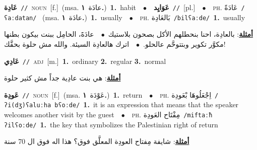 \documentclass[10pt,a4paper,twoside]{article} %
\begin{document}
\begin{multicols}{2}
{\setlength\topsep{0pt}\textbf{\foreignlanguage{arabic}{عَادِة}}\ {\color{gray}\texttt{//}\color{black}}\ \textsc{noun}\ [f.]\ \color{gray}(msa. \foreignlanguage{arabic}{عادَة}~\foreignlanguage{arabic}{\textbf{١.}})\color{black}\ \textbf{1.}~habit\ \ $\bullet$\ \ \setlength\topsep{0pt}\textbf{\foreignlanguage{arabic}{عَوَايِد}}\ {\color{gray}\texttt{//}\color{black}}\ [pl.]\ \ $\bullet$\ \ \textsc{ph.} \color{gray} \foreignlanguage{arabic}{عَادَةً}\color{black}\ {\color{gray}\texttt{/{\sffamily ʕaːdatan}/}\color{black}}\ \color{gray} (msa. \foreignlanguage{arabic}{عادَة}~\foreignlanguage{arabic}{\textbf{١.}})\color{black}\ \textbf{1.}~usually\ \ $\bullet$\ \ \textsc{ph.} \color{gray} \foreignlanguage{arabic}{بَالعَادِة}\color{black}\ {\color{gray}\texttt{/{\sffamily bilʕaːde}/}\color{black}}\ \textbf{1.}~usually\  \begin{flushright}\color{gray}\foreignlanguage{arabic}{\textbf{\underline{\foreignlanguage{arabic}{أمثلة}}}: بالعادِة، احنا بنحطلهم الأكل بصحون بلاستيك\ $\bullet$\ \  عادَةََ، الحامِل ببنت بيكون بطنها مكوَّر تكوير وبتتوحَّم عالحلو.\ $\bullet$\ \  اترك هالعادِة السيئة. والله مش حلوة بحقَّك!}\end{flushright}\color{black}} \vspace{2mm}

{\setlength\topsep{0pt}\textbf{\foreignlanguage{arabic}{عَادِي}}\ {\color{gray}\texttt{//}\color{black}}\ \textsc{adj}\ [m.]\ \textbf{1.}~ordinary  \textbf{2.}~regular  \textbf{3.}~normal\  \begin{flushright}\color{gray}\foreignlanguage{arabic}{\textbf{\underline{\foreignlanguage{arabic}{أمثلة}}}: هي بنت عادِية جداً مش كثير حلوة}\end{flushright}\color{black}} \vspace{2mm}

{\setlength\topsep{0pt}\textbf{\foreignlanguage{arabic}{عَودِة}}\ {\color{gray}\texttt{//}\color{black}}\ \textsc{noun}\ [f.]\ \color{gray}(msa. \foreignlanguage{arabic}{عَوْدَة}~\foreignlanguage{arabic}{\textbf{١.}})\color{black}\ \textbf{1.}~return\ \ $\bullet$\ \ \textsc{ph.} \color{gray} \foreignlanguage{arabic}{اِجْعَلُوهَا بْعَودِة}\color{black}\ {\color{gray}\texttt{/{\sffamily ʔi(dʒ)ʕaluːha bʕoːde}/}\color{black}}\ \textbf{1.}~it is an expression that means that the speaker welcomes another visit by the guest\ \ $\bullet$\ \ \textsc{ph.} \color{gray} \foreignlanguage{arabic}{مِفْتَاح العَودِة}\color{black}\ {\color{gray}\texttt{/{\sffamily miftaːħ ʔilʕoːde}/}\color{black}}\ \textbf{1.}~the key that symbolizes the Palestinian right of return\  \begin{flushright}\color{gray}\foreignlanguage{arabic}{\textbf{\underline{\foreignlanguage{arabic}{أمثلة}}}: شايفة مِفتاح العودِة المعلَّق فوق؟ هذا اله فوق ال 70 سنة}\end{flushright}\color{black}} \vspace{2mm}


\end{multicols}
\end{document}
